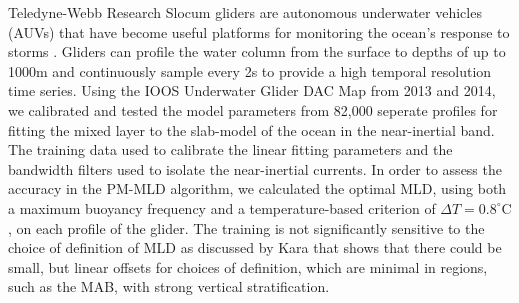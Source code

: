 \documentclass{article}
\begin{document}
Teledyne-Webb Research Slocum gliders are autonomous underwater vehicles (AUVs) that have become useful platforms for monitoring the ocean’s response to storms \cite{Miles2013,Seroka2016}. 
Gliders can profile the water column from the surface to depths of up to 1000m and continuously sample every 2s to provide a high temporal resolution time series.
Using the IOOS Underwater Glider DAC Map from 2013 and 2014, we calibrated and tested the model parameters from 82,000 seperate profiles for fitting the mixed layer to the slab-model of the ocean in the near-inertial band. 
The training data used to calibrate the linear fitting parameters and the bandwidth filters used to isolate the near-inertial currents.
In order to assess the accuracy in the PM-MLD algorithm, we calculated the optimal MLD, using both a maximum buoyancy frequency and a temperature-based criterion of $\Delta T = 0.8^{\circ}$C \cite{Kara2000}, on each profile of the glider. 
The training is not significantly sensitive to the choice of definition of MLD as discussed by Kara \cite{Kara2000} that shows that there could be small, but linear offsets for choices of definition, which are minimal in regions, such as the MAB, with strong vertical stratification. 
\end{document}
